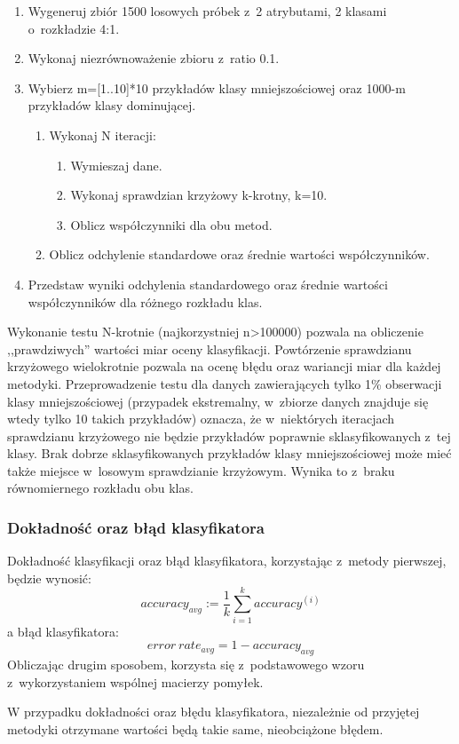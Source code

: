 \begin{enumerate}
	\item Wygeneruj zbiór 1500 losowych próbek z~2 atrybutami, 2 klasami o~rozkładzie 4:1.
	\item Wykonaj niezrównoważenie zbioru z~ratio 0.1.
	\item Wybierz m=[1..10]*10 przykładów klasy mniejszościowej oraz 1000-m przykładów klasy dominującej.
	\begin{enumerate}
		\item  Wykonaj N iteracji:
		\begin{enumerate}
			\item Wymieszaj dane.
			\item Wykonaj sprawdzian krzyżowy k-krotny, k=10.
			\item Oblicz współczynniki dla obu metod.
		\end{enumerate}
		\item Oblicz odchylenie standardowe oraz średnie wartości współczynników.
	\end{enumerate}
	\item Przedstaw wyniki odchylenia standardowego oraz średnie wartości współczynników dla różnego rozkładu klas.
\end{enumerate}
Wykonanie testu N-krotnie (najkorzystniej n>100000) pozwala na obliczenie ,,prawdziwych'' wartości miar oceny klasyfikacji. Powtórzenie sprawdzianu krzyżowego wielokrotnie pozwala na ocenę błędu oraz wariancji miar dla każdej metodyki. Przeprowadzenie testu dla danych zawierających tylko 1\% obserwacji klasy mniejszościowej (przypadek ekstremalny, w~zbiorze danych znajduje się wtedy tylko 10 takich przykładów) oznacza, że w~niektórych iteracjach sprawdzianu krzyżowego nie będzie przykładów poprawnie sklasyfikowanych z~tej klasy. Brak dobrze sklasyfikowanych przykładów klasy mniejszościowej może mieć także miejsce w~losowym sprawdzianie krzyżowym. Wynika to z~braku równomiernego rozkładu obu klas. 
\subsubsection{Dokładność oraz błąd klasyfikatora}
Dokładność klasyfikacji oraz błąd klasyfikatora, korzystając z~metody pierwszej, będzie wynosić:
\[accuracy_{avg} := \frac{1}{k} \sum_{i=1}^{k} accuracy^{(i)}\]
a błąd klasyfikatora:
\[error\ rate_{avg} = 1 - accuracy_{avg}\]
Obliczając drugim sposobem, korzysta się z~podstawowego wzoru z~wykorzystaniem wspólnej macierzy pomyłek. \par
W przypadku dokładności oraz błędu klasyfikatora, niezależnie od przyjętej metodyki otrzymane wartości będą takie same, nieobciążone błędem.
